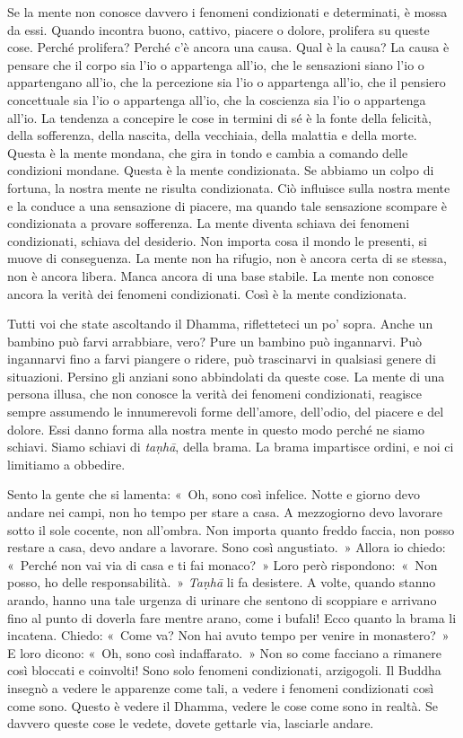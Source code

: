 Se la mente non conosce davvero i fenomeni condizionati e determinati, è
mossa da essi. Quando incontra buono, cattivo, piacere o dolore,
prolifera su queste cose. Perché prolifera? Perché c'è ancora una causa.
Qual è la causa? La causa è pensare che il corpo sia l'io o appartenga
all'io, che le sensazioni siano l'io o appartengano all'io, che la
percezione sia l'io o appartenga all'io, che il pensiero concettuale sia
l'io o appartenga all'io, che la coscienza sia l'io o appartenga all'io.
La tendenza a concepire le cose in termini di sé è la fonte della
felicità, della sofferenza, della nascita, della vecchiaia, della
malattia e della morte. Questa è la mente mondana, che gira in tondo e
cambia a comando delle condizioni mondane. Questa è la mente
condizionata. Se abbiamo un colpo di fortuna, la nostra mente ne risulta
condizionata. Ciò influisce sulla nostra mente e la conduce a una
sensazione di piacere, ma quando tale sensazione scompare è condizionata
a provare sofferenza. La mente diventa schiava dei fenomeni
condizionati, schiava del desiderio. Non importa cosa il mondo le
presenti, si muove di conseguenza. La mente non ha rifugio, non è ancora
certa di se stessa, non è ancora libera. Manca ancora di una base
stabile. La mente non conosce ancora la verità dei fenomeni
condizionati. Così è la mente condizionata.

Tutti voi che state ascoltando il Dhamma, rifletteteci un po' sopra.
Anche un bambino può farvi arrabbiare, vero? Pure un bambino può
ingannarvi. Può ingannarvi fino a farvi piangere o ridere, può
trascinarvi in qualsiasi genere di situazioni. Persino gli anziani sono
abbindolati da queste cose. La mente di una persona illusa, che non
conosce la verità dei fenomeni condizionati, reagisce sempre assumendo
le innumerevoli forme dell'amore, dell'odio, del piacere e del dolore.
Essi danno forma alla nostra mente in questo modo perché ne siamo
schiavi. Siamo schiavi di \emph{taṇhā}, della brama. La brama impartisce
ordini, e noi ci limitiamo a obbedire.

Sento la gente che si lamenta: «~Oh, sono così infelice. Notte e giorno
devo andare nei campi, non ho tempo per stare a casa. A mezzogiorno devo
lavorare sotto il sole cocente, non all'ombra. Non importa quanto freddo
faccia, non posso restare a casa, devo andare a lavorare. Sono così
angustiato.~» Allora io chiedo: «~Perché non vai via di casa e ti fai
monaco?~» Loro però rispondono:~«~Non posso, ho delle responsabilità.~»
\emph{Taṇhā} li fa desistere. A volte, quando stanno arando, hanno una
tale urgenza di urinare che sentono di scoppiare e arrivano fino al
punto di doverla fare mentre arano, come i bufali! Ecco quanto la brama
li incatena. Chiedo: «~Come va? Non hai avuto tempo per venire in
monastero?~» E loro dicono: «~Oh, sono così indaffarato.~» Non so come
facciano a rimanere così bloccati e coinvolti! Sono solo fenomeni
condizionati, arzigogoli. Il Buddha insegnò a vedere le apparenze come
tali, a vedere i fenomeni condizionati così come sono. Questo è vedere
il Dhamma, vedere le cose come sono in realtà. Se davvero queste cose le
vedete, dovete gettarle via, lasciarle andare.

